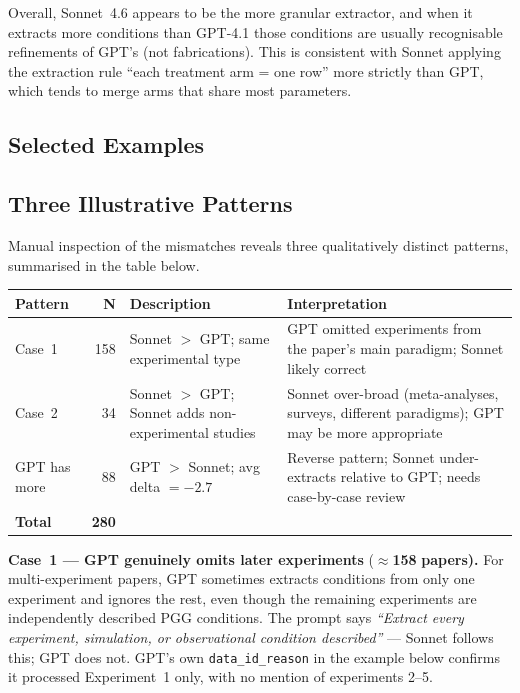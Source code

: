 \documentclass[11pt,a4paper]{article}
\begin{document}
        Overall, Sonnet~4.6 appears to be the more granular extractor, and when it
        extracts more conditions than GPT-4.1 those conditions are usually recognisable
        refinements of GPT's (not fabrications).  This is consistent with Sonnet
        applying the extraction rule ``each treatment arm = one row'' more strictly
        than GPT, which tends to merge arms that share most parameters.

        \subsection{Selected Examples}


\subsection{Three Illustrative Patterns}

Manual inspection of the mismatches reveals three qualitatively
distinct patterns, summarised in the table below.

\begin{center}\small
\begin{tabular}{lrp{5.5cm}p{5.5cm}}
\toprule
\textbf{Pattern} & \textbf{N} & \textbf{Description} & \textbf{Interpretation} \\
\midrule
Case~1 & 158 & Sonnet $>$ GPT; same experimental type & GPT omitted experiments from the paper's main paradigm; Sonnet likely correct \\[3pt]
Case~2 & 34 & Sonnet $>$ GPT; Sonnet adds non-experimental studies & Sonnet over-broad (meta-analyses, surveys, different paradigms); GPT may be more appropriate \\[3pt]
GPT has more & 88 & GPT $>$ Sonnet; avg delta $= -2.7$ & Reverse pattern; Sonnet under-extracts relative to GPT; needs case-by-case review \\[3pt]
\midrule
\textbf{Total} & \textbf{280} & & \\
\bottomrule
\end{tabular}
\end{center}

\medskip
\textbf{Case~1 --- GPT genuinely omits later experiments} ($\approx$\textbf{158} \textbf{papers).}
        For multi-experiment papers, GPT sometimes extracts conditions from only
        one experiment and ignores the rest, even though the remaining experiments
        are independently described PGG conditions.  The prompt says
        \emph{``Extract every experiment, simulation, or observational condition
        described''} --- Sonnet follows this; GPT does not.
        GPT's own \texttt{data\_id\_reason} in the example below confirms it
        processed Experiment~1 only, with no mention of experiments 2--5.
\end{document}
